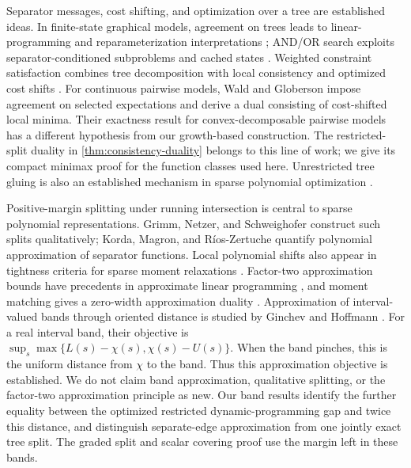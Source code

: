 Separator messages, cost shifting, and optimization over a tree are
established ideas. In finite-state graphical models, agreement on trees
leads to linear-programming and reparameterization interpretations
\citep{WainwrightEtAl2005}; AND/OR search exploits separator-conditioned
subproblems and cached states \citep{MarinescuDechter2009}.
Weighted constraint satisfaction combines tree decomposition with local
consistency and optimized cost shifts
\citep{deGivrySchiexVerfaillie2006,CooperDeGivrySchiex2007}.
For continuous pairwise models, Wald and Globerson
\citep{WaldGloberson2014} impose agreement on selected expectations and
derive a dual consisting of cost-shifted local minima. Their exactness
result for convex-decomposable pairwise models has a different hypothesis
from our growth-based construction. The restricted-split duality in
\cref{thm:consistency-duality} belongs to this line of work; we give its
compact minimax proof for the function classes used here. Unrestricted
tree gluing is also an established mechanism in sparse polynomial
optimization \citep{Lasserre2006}.

Positive-margin splitting under running intersection is central to sparse
polynomial representations. Grimm, Netzer, and Schweighofer
\citep{GrimmNetzerSchweighofer2007} construct such splits qualitatively;
Korda, Magron, and R\'ios-Zertuche
\citep{KordaMagronRiosZertuche2025} quantify polynomial approximation of
separator functions. Local polynomial shifts also appear in tightness
criteria for sparse moment relaxations \citep{NieQuTangZhang2026}.
Factor-two approximation bounds have precedents in approximate linear
programming \citep{deFariasVanRoy2003}, and moment matching gives a
zero-width approximation duality \citep{HanJiaoWeissman2018}.
Approximation of interval-valued bands through oriented distance is
studied by Ginchev and Hoffmann \citep{GinchevHoffmann2002}.
For a real interval band, their objective is
$\sup_s\max\{L(s)-\chi(s),\chi(s)-U(s)\}$. When the band pinches,
this is the uniform distance from $\chi$ to the band. Thus this
approximation objective is established.
We do not claim band approximation, qualitative splitting, or the
factor-two approximation principle as new. Our band results identify the
further equality between the optimized restricted dynamic-programming
gap and twice this distance, and distinguish separate-edge approximation
from one jointly exact tree split. The graded split and scalar covering
proof use the margin left in these bands.

